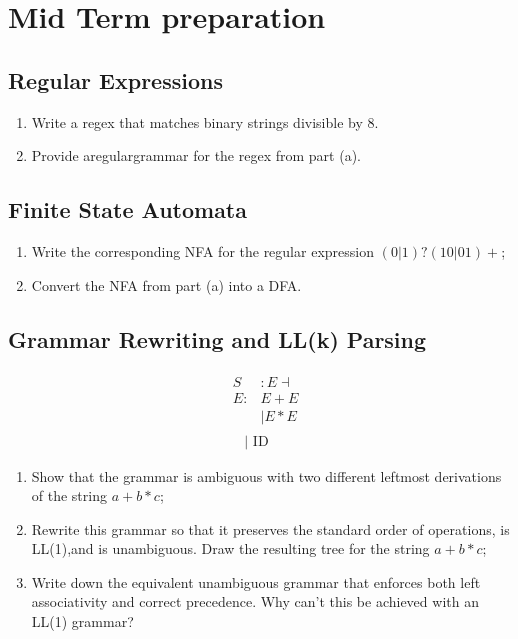 \documentclass[a4paper]{article}
\theoremstyle{definition}
\begin{document}
\section{Mid Term preparation}
\subsection{Regular Expressions}
\begin{enumerate}
   \item Write a regex that matches binary strings divisible by 8.
   \item Provide aregulargrammar for the regex from part (a).
 \end{enumerate}

  \subsection{Finite State Automata}
  \begin{enumerate}
    \item Write the corresponding NFA for the regular expression $(0|1)?(10|01)+$;
    \item Convert the NFA from part (a) into a DFA.
  \end{enumerate}
  
  \subsection{Grammar Rewriting and LL(k) Parsing}
  $$
\begin{aligned}
&\begin{aligned}
S &: E \dashv \\
E: & E+E \\
& \mid E * E
\end{aligned}\\
&\quad 
 \ \mid \text { ID }
\end{aligned}
$$
  \begin{enumerate}
    \item Show that the grammar is ambiguous with two different leftmost derivations of the string $a+b*c$;
    \item Rewrite this grammar so that it preserves the standard order of operations, is LL(1),and is unambiguous.  Draw the resulting tree for the string $a+b*c$;
    \item Write down the equivalent unambiguous grammar that enforces both left associativity and correct precedence.  Why can’t this be achieved with an LL(1) grammar?
  \end{enumerate}
\end{document}
